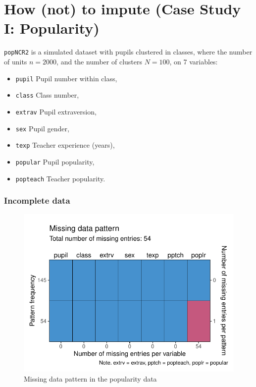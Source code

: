 \documentclass[
]{jss}
\providecommand{\tightlist}{%
  \setlength{\itemsep}{0pt}\setlength{\parskip}{0pt}}
\begin{document}
\hypertarget{how-not-to-impute-case-study-i-popularity}{%
\section{How (not) to impute (Case Study I:
Popularity)}\label{how-not-to-impute-case-study-i-popularity}}

\texttt{popNCR2} is a simulated dataset with pupils clustered in
classes, where the number of units \(n = 2000\), and the number of
clusters \(N = 100\), on 7 variables:

\begin{itemize}
\tightlist
\item
  \texttt{pupil} Pupil number within class,
\item
  \texttt{class} Class number,
\item
  \texttt{extrav} Pupil extraversion,
\item
  \texttt{sex} Pupil gender,
\item
  \texttt{texp} Teacher experience (years),
\item
  \texttt{popular} Pupil popularity,
\item
  \texttt{popteach} Teacher popularity.
\end{itemize}

\hypertarget{incomplete-data}{%
\subsubsection{Incomplete data}\label{incomplete-data}}

\begin{CodeChunk}
\begin{figure}

{\centering \includegraphics{Manuscript_files/figure-latex/pop_pat-1} 

}

\caption[Missing data pattern in the popularity data]{Missing data pattern in the popularity data}\label{fig:pop_pat}
\end{figure}
\end{CodeChunk}
\end{document}
